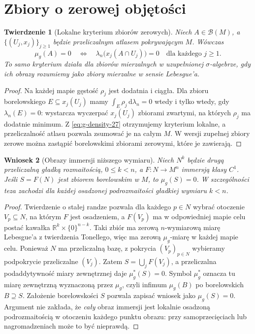 \documentclass[11pt,a4paper,oneside]{book}
\numberwithin{equation}{chapter}
\theoremstyle{plain}
\newtheorem{twierdzenie}{Twierdzenie}[chapter]
\newtheorem{wniosek}[twierdzenie]{Wniosek}
\theoremstyle{definition}
\theoremstyle{remark}
\begin{document}
\section{Zbiory o zerowej objętości}
\begin{twierdzenie}[Lokalne kryterium zbiorów zerowych]
\label{thm:null-local-27}
Niech $A\in\mathcal B(M)$, a
$\{(U_j,x_j)\}_{j\ge1}$ będzie przeliczalnym atlasem
pokrywającym $M$. Wówczas
\[
 \mu_g(A)=0\quad\Longleftrightarrow\quad
 \lambda_n\bigl(x_j(A\cap U_j)\bigr)=0
 \quad\text{dla każdego }j\ge1.
\]
To samo kryterium działa dla zbiorów mierzalnych
w uzupełnionej $\sigma$-algebrze, gdy ich obrazy
rozumiemy jako zbiory mierzalne w sensie Lebesgue'a.
\end{twierdzenie}
\begin{proof}
Na każdej mapie gęstość $\rho_j$ jest dodatnia
i ciągła. Dla zbioru borelowskiego $E\subseteq x_j(U_j)$
mamy $\int_E\rho_j\,\mathrm d\lambda_n=0$
wtedy i tylko wtedy, gdy $\lambda_n(E)=0$:
wystarcza wyczerpać $x_j(U_j)$ zbiorami zwartymi,
na których $\rho_j$ ma dodatnie minimum.
Z \eqref{eq:g-density-27} otrzymujemy kryterium
lokalne, a przeliczalność atlasu pozwala
zsumować je na całym $M$. W wersji zupełnej
zbiory zerowe można zastąpić borelowskimi
zbiorami zerowymi, które je zawierają.
\end{proof}

\begin{wniosek}[Obrazy immersji niższego wymiaru]
\label{cor:submanifold-null-27}
Niech $N^k$ będzie drugą przeliczalną gładką
rozmaitością, $0\le k<n$, a $F:N\to M^n$
immersją klasy $C^1$. Jeśli $S=F(N)$ jest
zbiorem borelowskim w $M$, to $\mu_g(S)=0$.
W szczególności teza zachodzi dla każdej osadzonej
podrozmaitości gładkiej wymiaru $k<n$.
\end{wniosek}
\begin{proof}
Twierdzenie o stałej randze pozwala dla każdego
$p\in N$ wybrać otoczenie $V_p\subseteq N$,
na którym $F$ jest osadzeniem, a $F(V_p)$
ma w odpowiedniej mapie celu postać kawałka
$\mathbb R^k\times\{0\}^{n-k}$.
Taki zbiór ma zerową $n$-wymiarową miarę
Lebesgue'a z twierdzenia Tonellego, więc
ma zerową $\mu_g$-miarę w każdej mapie celu.
Ponieważ $N$ ma przeliczalną bazę, z pokrycia
$(V_p)_{p\in N}$ wybieramy podpokrycie
przeliczalne $(V_j)$. Zatem
$S=\bigcup_jF(V_j)$, a przeliczalna
podaddytywność miary zewnętrznej daje
$\mu_g^*(S)=0$. Symbol $\mu_g^*$ oznacza tu miarę
zewnętrzną wyznaczoną przez $\mu_g$, czyli infimum
$\mu_g(B)$ po borelowskich $B\supseteq S$. Założenie borelowskości $S$
pozwala zapisać wniosek jako $\mu_g(S)=0$.
Argument nie zakłada, że \emph{cały} obraz immersji
jest lokalnie osadzoną podrozmaitością w otoczeniu
każdego punktu obrazu: przy samoprzecięciach lub
nagromadzeniach może to być nieprawdą.
\end{proof}
\end{document}
